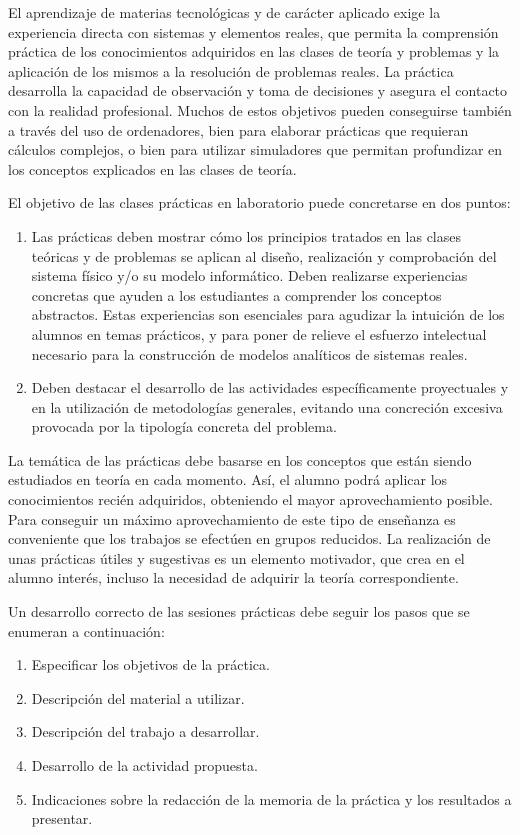 El aprendizaje de materias tecnológicas y de carácter aplicado exige la experiencia directa con sistemas y elementos reales, que permita la comprensión práctica de los conocimientos adquiridos en las clases de teoría y problemas y la aplicación de los mismos a la resolución de problemas reales. La práctica desarrolla la capacidad de observación y toma de decisiones y asegura el contacto con la realidad profesional. Muchos de estos objetivos pueden conseguirse también a través del uso de ordenadores, bien para elaborar prácticas que requieran cálculos complejos, o bien para utilizar simuladores que permitan profundizar en los conceptos explicados en las clases de teoría.

El objetivo de las clases prácticas en laboratorio puede concretarse en dos puntos:
\begin{enumerate}
\item	Las prácticas deben mostrar cómo los principios tratados en las clases teóricas y de problemas se aplican al diseño, realización y comprobación del sistema físico y/o su modelo informático. Deben realizarse experiencias concretas que ayuden a los estudiantes a comprender los conceptos abstractos. Estas experiencias son esenciales para agudizar la intuición de los alumnos en temas prácticos, y para poner de relieve el esfuerzo intelectual necesario para la construcción de modelos analíticos de sistemas reales.
\item	Deben destacar el desarrollo de las actividades específicamente proyectuales y en la utilización de metodologías generales, evitando una concreción excesiva provocada por la tipología concreta del problema.
\end{enumerate}

La temática de las prácticas debe basarse en los conceptos que están siendo estudiados en teoría en cada momento. Así, el alumno podrá aplicar los conocimientos recién adquiridos, obteniendo el mayor aprovechamiento posible. Para conseguir un máximo aprovechamiento de este tipo de enseñanza es conveniente que los trabajos se efectúen en grupos reducidos. La realización de unas prácticas útiles y sugestivas es un elemento motivador, que crea en el alumno interés, incluso la necesidad de adquirir la teoría correspondiente.

Un desarrollo correcto de las sesiones prácticas debe seguir los pasos que se enumeran a continuación:
\begin{enumerate}
\item	Especificar los objetivos de la práctica.
\item	Descripción del material a utilizar.
\item	Descripción del trabajo a desarrollar.
\item	Desarrollo de la actividad propuesta.
\item	Indicaciones sobre la redacción de la memoria de la práctica y los resultados a presentar.
\end{enumerate}


